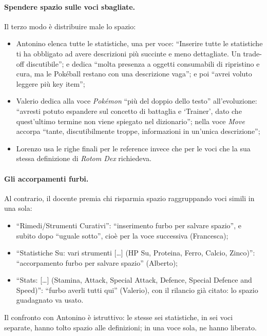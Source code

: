 \paragraph{Spendere spazio sulle voci sbagliate.} Il terzo modo è distribuire
male lo spazio:
\begin{itemize}
  \item Antonino elenca tutte le statistiche, una per voce: ``Inserire tutte
        le statistiche ti ha obbligato ad avere descrizioni più succinte e
        meno dettagliate. Un trade-off discutibile''; e dedica ``molta
        presenza a oggetti consumabili di ripristino e cura, ma le Pokéball
        restano con una descrizione vaga''; e poi ``avrei voluto leggere più
        key item'';
  \item Valerio dedica alla voce \emph{Pokémon} ``più del doppio dello testo''
        all'evoluzione: ``avresti potuto espandere sul concetto di battaglia e
        `Trainer', dato che quest'ultimo termine non viene spiegato nel
        dizionario''; nella voce \emph{Move} accorpa ``tante, discutibilmente
        troppe, informazioni in un'unica descrizione'';
  \item Lorenzo usa le righe finali per le reference invece che per le voci
        che la sua stessa definizione di \emph{Rotom Dex} richiedeva.
\end{itemize}

\paragraph{Gli accorpamenti furbi.} Al contrario, il docente premia chi
risparmia spazio raggruppando voci simili in una sola:
\begin{itemize}
  \item ``Rimedi/Strumenti Curativi'': ``inserimento furbo per salvare
        spazio'', e subito dopo ``uguale sotto'', cioè per la voce successiva
        (Francesca);
  \item ``Statistiche Su: vari strumenti [\dots] (HP Su, Proteina, Ferro,
        Calcio, Zinco)'': ``accorpamento furbo per salvare spazio'' (Alberto);
  \item ``Stats: [\dots] (Stamina, Attack, Special Attack, Defence, Special
        Defence and Speed)'': ``furbo averli tutti qui'' (Valerio), con il
        rilancio già citato: lo spazio guadagnato va usato.
\end{itemize}
Il confronto con Antonino è istruttivo: le stesse sei statistiche, in sei voci
separate, hanno tolto spazio alle definizioni; in una voce sola, ne hanno
liberato.

